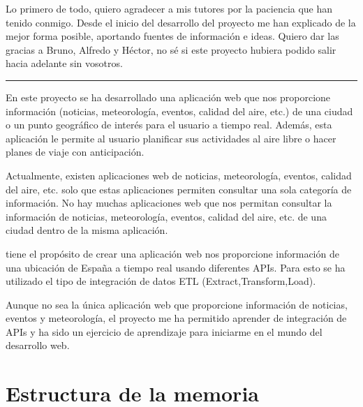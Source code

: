 
Lo primero de todo, quiero agradecer a mis tutores por la paciencia que han tenido conmigo. Desde el inicio del desarrollo del proyecto me han explicado de la mejor forma posible, aportando fuentes de información e ideas. Quiero dar las gracias a Bruno, Alfredo y Héctor, no sé si este proyecto hubiera podido salir hacia adelante sin vosotros.

\noindent\rule{2cm}{0.4pt}

En este proyecto se ha desarrollado una aplicación web que nos proporcione información (noticias, meteorología, eventos, calidad del aire, etc.) de una ciudad o un punto geográfico de interés para el usuario a tiempo real. Además, esta aplicación le permite al usuario planificar sus actividades al aire libre o hacer planes de viaje con anticipación.

Actualmente, existen aplicaciones web de noticias, meteorología, eventos, calidad del aire, etc. solo que estas aplicaciones permiten consultar una sola categoría de información. No hay muchas aplicaciones web que nos permitan consultar la información de noticias, meteorología, eventos, calidad del aire, etc. de una ciudad dentro de la misma aplicación.

 tiene el propósito de crear una aplicación web nos proporcione información de una ubicación de España a tiempo real usando diferentes APIs.
Para esto se ha utilizado el tipo de integración de datos ETL (Extract,Transform,Load).

Aunque no sea la única aplicación web que proporcione información de noticias, eventos y meteorología, el proyecto me ha permitido aprender de integración de APIs y ha sido un ejercicio de aprendizaje para iniciarme en el mundo del desarrollo web.

\newpage
\section{Estructura de la memoria}

